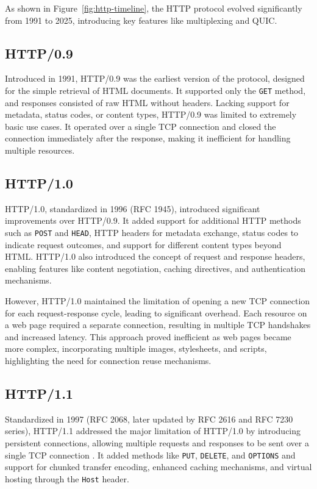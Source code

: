 As shown in Figure~\ref{fig:http-timeline}, the HTTP protocol evolved significantly from 1991 to 2025, introducing key features like multiplexing and QUIC.

\subsection{HTTP/0.9}

Introduced in 1991, HTTP/0.9 was the earliest version of the protocol, designed for the simple retrieval of HTML documents. It supported only the \texttt{GET} method, and responses consisted of raw HTML without headers. Lacking support for metadata, status codes, or content types, HTTP/0.9 was limited to extremely basic use cases. It operated over a single TCP connection and closed the connection immediately after the response, making it inefficient for handling multiple resources.

\subsection{HTTP/1.0}

HTTP/1.0, standardized in 1996 (RFC 1945), introduced significant improvements over HTTP/0.9. It added support for additional HTTP methods such as \texttt{POST} and \texttt{HEAD}, HTTP headers for metadata exchange, status codes to indicate request outcomes, and support for different content types beyond HTML. HTTP/1.0 also introduced the concept of request and response headers, enabling features like content negotiation, caching directives, and authentication mechanisms.

However, HTTP/1.0 maintained the limitation of opening a new TCP connection for each request-response cycle, leading to significant overhead. Each resource on a web page required a separate connection, resulting in multiple TCP handshakes and increased latency. This approach proved inefficient as web pages became more complex, incorporating multiple images, stylesheets, and scripts, highlighting the need for connection reuse mechanisms.

\subsection{HTTP/1.1}

Standardized in 1997 (RFC 2068, later updated by RFC 2616 and RFC 7230 series), HTTP/1.1 addressed the major limitation of HTTP/1.0 by introducing persistent connections, allowing multiple requests and responses to be sent over a single TCP connection \cite{kurose2017}. It added methods like \texttt{PUT}, \texttt{DELETE}, and \texttt{OPTIONS} and support for chunked transfer encoding, enhanced caching mechanisms, and virtual hosting through the \texttt{Host} header.

